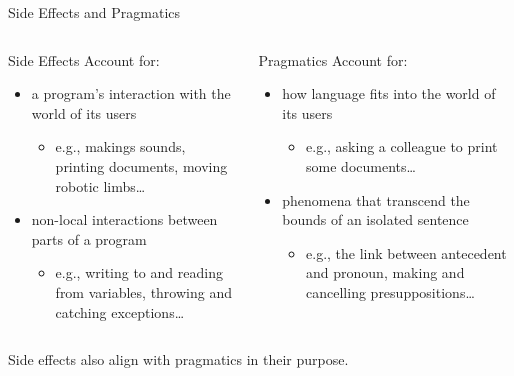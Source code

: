 \documentclass{beamer}
\begin{document}
\begin{frame}{Side Effects and Pragmatics}
  \begin{columns}
    \begin{column}{0.5\textwidth}
   \begin{block}{Side Effects}
   Account for:
  \pause
  \vfill
  \begin{itemize}
  \item a program's interaction with the world of its users
    \begin{itemize}
    \item e.g., makings sounds, printing documents, moving robotic limbs\ldots
    \end{itemize}
  \end{itemize}
  \pause
  \vfill
  \begin{itemize}
  \item non-local interactions between parts of a program
    \begin{itemize}
    \item e.g., writing to and reading from variables, throwing and
      catching exceptions\ldots
    \end{itemize}
  \end{itemize}
  \end{block}
   \pause
    \end{column}
    \begin{column}{0.5\textwidth}
      \begin{block}{Pragmatics}
        Account for:
        \pause
        \vfill
        \begin{itemize}
        \item how language fits into the world of its users
          \begin{itemize}
          \item e.g., asking a colleague to print some documents\ldots
          \end{itemize}
        \pause \vfill
        \item phenomena that transcend the bounds of an isolated sentence
          \begin{itemize}
          \item e.g., the link between antecedent and pronoun, making and
            cancelling presuppositions\ldots
          \end{itemize}
        \end{itemize}
      \end{block}
    \end{column}
  \end{columns}
  \vfill
  \pause
  \alert{Side effects also align with pragmatics in their purpose.}
\end{frame}
\end{document}

